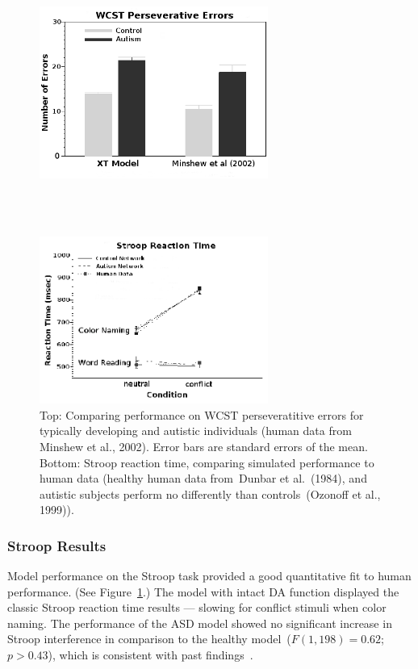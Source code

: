 \begin{figure}
\begin{center}
	\includegraphics[width=75mm]{graphs/wcst.ps}
                                                                
\textcolor{white}{\\--------------------------------\\}

	\includegraphics[width=75mm]{graphs/stroop.ps}
\end{center}
\caption{Top: Comparing performance on WCST perseveratitive errors for typically developing and autistic individuals (human data from Minshew et al., 2002). Error bars are standard errors of the mean. Bottom: Stroop reaction time, comparing simulated performance to human data (healthy human data from~Dunbar et al.~(1984), and autistic subjects perform no differently than controls~(Ozonoff et al., 1999)).} 
\label{ed-results-figure}
\end{figure} 

\subsubsection{Stroop Results} 
Model performance on the Stroop task provided a good quantitative fit to human performance. (See Figure~\ref{ed-results-figure}.) The model with intact DA function displayed the classic Stroop reaction time results --- slowing for conflict stimuli when color naming. The performance of the ASD model showed no significant increase in Stroop interference in comparison to the healthy model~($F(1,198) = 0.62$; $p > 0.43$), which is consistent with past findings~\cite{Ozonoff:1999:AutismStroopWCST}.

